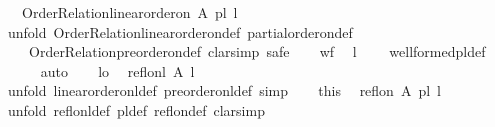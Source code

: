 \begin{isabellebody}
\ \ \ {\isachardoublequoteopen}Order{\isacharunderscore}{\kern0pt}Relation{\isachardot}{\kern0pt}linear{\isacharunderscore}{\kern0pt}order{\isacharunderscore}{\kern0pt}on\ A\ {\isacharparenleft}{\kern0pt}pl{\isacharunderscore}{\kern0pt}{\isasymalpha}\ l{\isacharparenright}{\kern0pt}{\isachardoublequoteclose}\isanewline
%
\isadelimproof
%
\endisadelimproof
%
\isatagproof
{}\isamarkupfalse%
\ {\isacharparenleft}{\kern0pt}unfold\ Order{\isacharunderscore}{\kern0pt}Relation{\isachardot}{\kern0pt}linear{\isacharunderscore}{\kern0pt}order{\isacharunderscore}{\kern0pt}on{\isacharunderscore}{\kern0pt}def\ partial{\isacharunderscore}{\kern0pt}order{\isacharunderscore}{\kern0pt}on{\isacharunderscore}{\kern0pt}def\ \isanewline
\ \ \ \ Order{\isacharunderscore}{\kern0pt}Relation{\isachardot}{\kern0pt}preorder{\isacharunderscore}{\kern0pt}on{\isacharunderscore}{\kern0pt}def{\isacharcomma}{\kern0pt}\ clarsimp{\isacharcomma}{\kern0pt}\ safe{\isacharparenright}{\kern0pt}\isanewline
\ \ \isamarkupfalse%
\ wf\ \isamarkupfalse%
\ {\isachardoublequoteopen}l\ {\isasymnoteq}\ {\isacharbrackleft}{\kern0pt}{\isacharbrackright}{\kern0pt}{\isachardoublequoteclose}\ \isamarkupfalse%
\ well{\isacharunderscore}{\kern0pt}formed{\isacharunderscore}{\kern0pt}pl{\isacharunderscore}{\kern0pt}def\isanewline
\ \ \ \ \isamarkupfalse%
\ auto\isanewline
\ \ \isamarkupfalse%
\ lo\ \isamarkupfalse%
\ {\isachardoublequoteopen}refl{\isacharunderscore}{\kern0pt}on{\isacharunderscore}{\kern0pt}l\ A\ l{\isachardoublequoteclose}\ \isanewline
\ \ \ \ \isamarkupfalse%
\ {\isacharparenleft}{\kern0pt}unfold\ linear{\isacharunderscore}{\kern0pt}order{\isacharunderscore}{\kern0pt}on{\isacharunderscore}{\kern0pt}l{\isacharunderscore}{\kern0pt}def\ preorder{\isacharunderscore}{\kern0pt}on{\isacharunderscore}{\kern0pt}l{\isacharunderscore}{\kern0pt}def{\isacharcomma}{\kern0pt}\ simp{\isacharparenright}{\kern0pt}\isanewline
\ \ \isamarkupfalse%
\ this\ \isamarkupfalse%
\ {\isachardoublequoteopen}refl{\isacharunderscore}{\kern0pt}on\ A\ {\isacharparenleft}{\kern0pt}pl{\isacharunderscore}{\kern0pt}{\isasymalpha}\ l{\isacharparenright}{\kern0pt}{\isachardoublequoteclose}\ \isanewline
\ \ \isamarkupfalse%
\ {\isacharparenleft}{\kern0pt}unfold\ refl{\isacharunderscore}{\kern0pt}on{\isacharunderscore}{\kern0pt}l{\isacharunderscore}{\kern0pt}def\ pl{\isacharunderscore}{\kern0pt}{\isasymalpha}{\isacharunderscore}{\kern0pt}def\ refl{\isacharunderscore}{\kern0pt}on{\isacharunderscore}{\kern0pt}def{\isacharcomma}{\kern0pt}\ clarsimp{\isacharparenright}{\kern0pt}\isanewline

\end{isabellebody}
